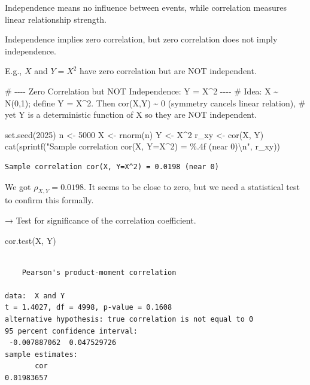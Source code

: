 \documentclass[
  12pt,
  a4paper,
]{scrbook}
\newenvironment{Shaded}{\begin{snugshade}}{\end{snugshade}}
\newcommand{\CommentTok}[1]{\textcolor[rgb]{0.37,0.37,0.37}{#1}}
\newcommand{\DecValTok}[1]{\textcolor[rgb]{0.68,0.00,0.00}{#1}}
\newcommand{\FunctionTok}[1]{\textcolor[rgb]{0.28,0.35,0.67}{#1}}
\newcommand{\NormalTok}[1]{\textcolor[rgb]{0.00,0.23,0.31}{#1}}
\newcommand{\OtherTok}[1]{\textcolor[rgb]{0.00,0.23,0.31}{#1}}
\newcommand{\SpecialCharTok}[1]{\textcolor[rgb]{0.37,0.37,0.37}{#1}}
\newcommand{\StringTok}[1]{\textcolor[rgb]{0.13,0.47,0.30}{#1}}
\theoremstyle{plain}
\theoremstyle{definition}
\theoremstyle{remark}
\begin{document}
Independence means no influence between events, while correlation
measures linear relationship strength.

Independence implies zero correlation, but zero correlation does not
imply independence.

E.g., \(X\) and \(Y = X^2\) have zero correlation but are NOT
independent.

\begin{Shaded}
\begin{Highlighting}[]
\CommentTok{\# {-}{-}{-}{-} Zero Correlation but NOT Independence: Y = X\^{}2 {-}{-}{-}{-}}
\CommentTok{\# Idea: X \textasciitilde{} N(0,1); define Y = X\^{}2. Then cor(X,Y) \textasciitilde{} 0 (symmetry cancels linear relation),}
\CommentTok{\# yet Y is a deterministic function of X so they are NOT independent.}

\FunctionTok{set.seed}\NormalTok{(}\DecValTok{2025}\NormalTok{)}
\NormalTok{n }\OtherTok{\textless{}{-}} \DecValTok{5000}
\NormalTok{X }\OtherTok{\textless{}{-}} \FunctionTok{rnorm}\NormalTok{(n)}
\NormalTok{Y }\OtherTok{\textless{}{-}}\NormalTok{ X}\SpecialCharTok{\^{}}\DecValTok{2}
\NormalTok{r\_xy }\OtherTok{\textless{}{-}} \FunctionTok{cor}\NormalTok{(X, Y)}
\FunctionTok{cat}\NormalTok{(}\FunctionTok{sprintf}\NormalTok{(}\StringTok{"Sample correlation cor(X, Y=X\^{}2) = \%.4f (near 0)}\SpecialCharTok{\textbackslash{}n}\StringTok{"}\NormalTok{, r\_xy))}
\end{Highlighting}
\end{Shaded}

\begin{verbatim}
Sample correlation cor(X, Y=X^2) = 0.0198 (near 0)
\end{verbatim}

We got \(\rho_{X,Y}=0.0198\). It seems to be close to zero, but we need
a statistical test to confirm this formally.

→ Test for significance of the correlation coefficient.

\begin{Shaded}
\begin{Highlighting}[]
\FunctionTok{cor.test}\NormalTok{(X, Y)}
\end{Highlighting}
\end{Shaded}

\begin{verbatim}

    Pearson's product-moment correlation

data:  X and Y
t = 1.4027, df = 4998, p-value = 0.1608
alternative hypothesis: true correlation is not equal to 0
95 percent confidence interval:
 -0.007887062  0.047529726
sample estimates:
       cor 
0.01983657 
\end{verbatim}
\end{document}

